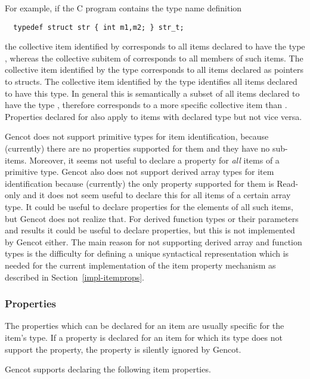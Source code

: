 For example, if the C program contains the type name definition 
\begin{verbatim}
  typedef struct str { int m1,m2; } str_t;
\end{verbatim}
the collective item identified by  corresponds to all items declared to have the type ,
whereas the collective subitem  of  corresponds to all members  of such items. The collective
item identified by the type  corresponds to all items declared as pointers to  structs.
The collective item identified by the type  identifies all items declared to have this type. In general 
this is semantically a subset of all items declared to have the type , therefore  corresponds
to a more specific collective item than . Properties declared for  also apply to items
with declared type  but not vice versa.

Gencot does not support primitive types for item identification, because (currently) there are no properties supported
for them and they have no sub-items. Moreover, it seems not useful to declare a property for \textit{all} items of
a primitive type. Gencot also does not support derived array types for item identification because (currently) the only 
property supported for them is Read-only and it does not seem useful to declare this for all items of a certain array 
type. It could be useful to declare properties for the elements of all such items, but Gencot does not realize that.
For derived function types or their parameters and results it could be useful to declare properties, but this is not
implemented by Gencot either. The main reason for not supporting derived array and function types is the difficulty
for defining a unique syntactical representation which is needed for the current implementation of the item property
mechanism as described in Section~\ref{impl-itemprops}.

\subsubsection{Properties}

The properties which can be declared for an item are usually specific for the item's type. If a property is declared
for an item for which its type does not support the property, the property is silently ignored by Gencot.

Gencot supports declaring the following item properties.

